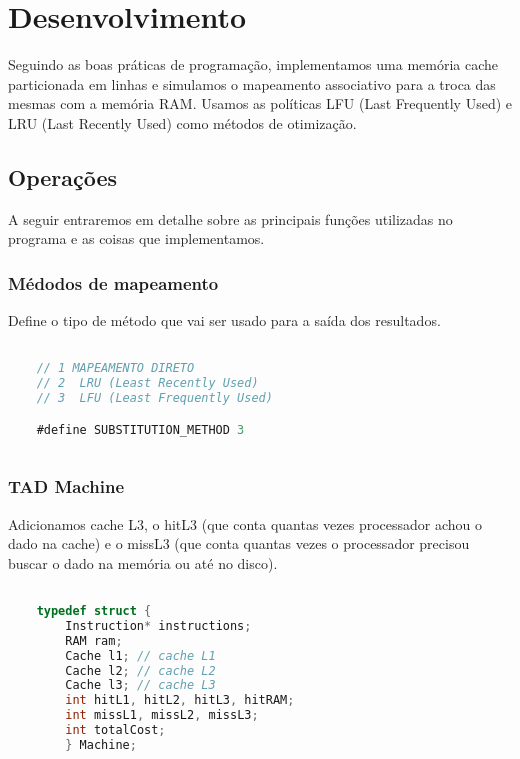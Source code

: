 \documentclass{article}
\begin{document}
\clearpage



\section{Desenvolvimento}

Seguindo as boas práticas de programação, implementamos uma memória cache particionada em linhas e simulamos o mapeamento associativo para a troca das mesmas com a memória RAM. Usamos as políticas LFU (Last Frequently Used) e LRU (Last Recently Used) como métodos de otimização.



\subsection{Operações}

A seguir entraremos em detalhe sobre as principais funções utilizadas no programa e as coisas que implementamos.

\subsubsection{Médodos de mapeamento}

Define o tipo de método que vai ser usado para a saída dos resultados.

\begin{lstlisting}[caption={Definição do tipo de método},label={lst:cod1},language=C]

    // 1 MAPEAMENTO DIRETO
    // 2  LRU (Least Recently Used)
    // 3  LFU (Least Frequently Used)

    #define SUBSTITUTION_METHOD 3
    
\end{lstlisting}

\subsubsection{TAD Machine}

Adicionamos cache L3, o hitL3 (que conta quantas vezes processador achou o dado na cache) e o missL3 (que conta quantas vezes o processador precisou buscar o dado na memória ou até no disco).

\begin{lstlisting}[caption={TAD Machine},label={lst:cod2},language=C]

    typedef struct {
        Instruction* instructions;
        RAM ram;
        Cache l1; // cache L1
        Cache l2; // cache L2
        Cache l3; // cache L3
        int hitL1, hitL2, hitL3, hitRAM;
        int missL1, missL2, missL3;
        int totalCost;
        } Machine;

    \end{lstlisting}
\end{document}
